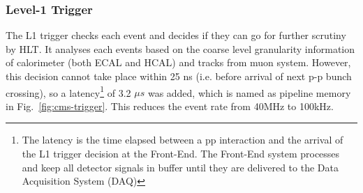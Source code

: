 \subsubsection{Level-1 Trigger} %
\label{ssub:level_1_trigger}
The L1 trigger checks each event and decides if they can go for further scrutiny by HLT. It analyses each events based on the coarse level granularity information of calorimeter (both ECAL and HCAL) and tracks from muon system. However, this decision cannot take place within 25 ns (i.e. before arrival of next p-p bunch crossing), so a latency\footnote{The latency is the time elapsed between a pp interaction and the arrival of the L1 trigger decision at the Front-End. The Front-End system processes and keep all detector signals in buffer until they are delivered to the Data Acquisition System (DAQ)} of 3.2 $\mu s$ was added, which is named as pipeline memory in Fig.~\ref{fig:cms-trigger}. This reduces the event rate from 40MHz to 100kHz.

